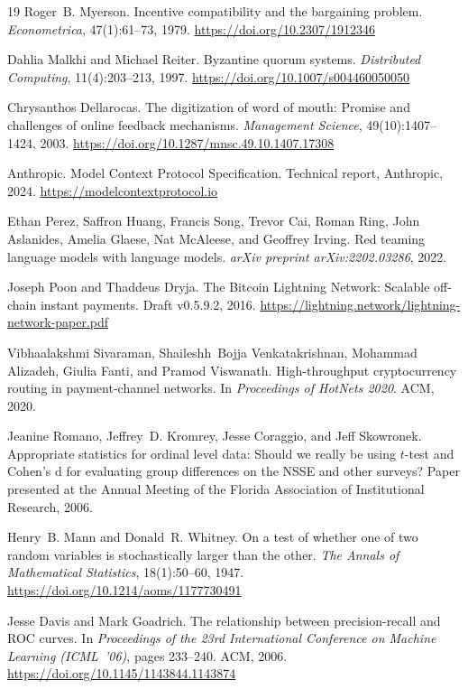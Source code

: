\documentclass[sigconf,nonacm,10pt]{acmart}
\begin{document}
\begin{thebibliography}{19}
Roger~B. Myerson.
\newblock Incentive compatibility and the bargaining problem.
\newblock \emph{Econometrica}, 47(1):61--73, 1979.
\newblock \url{https://doi.org/10.2307/1912346}

Dahlia Malkhi and Michael Reiter.
\newblock Byzantine quorum systems.
\newblock \emph{Distributed Computing}, 11(4):203--213, 1997.
\newblock \url{https://doi.org/10.1007/s004460050050}

Chrysanthos Dellarocas.
\newblock The digitization of word of mouth: Promise and challenges
  of online feedback mechanisms.
\newblock \emph{Management Science}, 49(10):1407--1424, 2003.
\newblock \url{https://doi.org/10.1287/mnsc.49.10.1407.17308}

{Anthropic}.
\newblock Model {Context} {Protocol} Specification.
\newblock Technical report, Anthropic, 2024.
\newblock \url{https://modelcontextprotocol.io}

Ethan Perez, Saffron Huang, Francis Song, Trevor Cai, Roman Ring,
  John Aslanides, Amelia Glaese, Nat McAleese, and Geoffrey Irving.
\newblock Red teaming language models with language models.
\newblock \emph{arXiv preprint arXiv:2202.03286}, 2022.

Joseph Poon and Thaddeus Dryja.
\newblock The {Bitcoin} {Lightning} {Network}: Scalable off-chain
  instant payments.
\newblock Draft v0.5.9.2, 2016.
\newblock \url{https://lightning.network/lightning-network-paper.pdf}

Vibhaalakshmi Sivaraman, Shaileshh~Bojja Venkatakrishnan, Mohammad
  Alizadeh, Giulia Fanti, and Pramod Viswanath.
\newblock High-throughput cryptocurrency routing in payment-channel
  networks.
\newblock In \emph{Proceedings of HotNets 2020}. ACM, 2020.

Jeanine Romano, Jeffrey~D. Kromrey, Jesse Coraggio, and Jeff
  Skowronek.
\newblock Appropriate statistics for ordinal level data: Should
  we really be using $t$-test and {Cohen's d} for evaluating group
  differences on the {NSSE} and other surveys?
\newblock Paper presented at the Annual Meeting of the Florida
  Association of Institutional Research, 2006.

Henry~B. Mann and Donald~R. Whitney.
\newblock On a test of whether one of two random variables is
  stochastically larger than the other.
\newblock \emph{The Annals of Mathematical Statistics},
  18(1):50--60, 1947.
\newblock \url{https://doi.org/10.1214/aoms/1177730491}

Jesse Davis and Mark Goadrich.
\newblock The relationship between precision-recall and {ROC}
  curves.
\newblock In \emph{Proceedings of the 23rd International Conference
  on Machine Learning (ICML~'06)}, pages 233--240. ACM, 2006.
\newblock \url{https://doi.org/10.1145/1143844.1143874}

\end{thebibliography}
\end{document}
